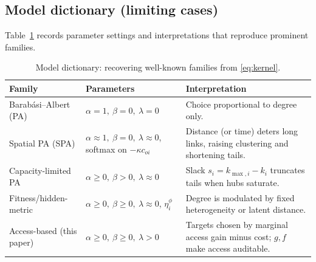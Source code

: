 \documentclass{article}[12pt]
\begin{document}

\subsection{Model dictionary (limiting cases)}
Table~\ref{tab:dictionary} records parameter settings and interpretations that reproduce prominent families.

\begin{table}[H]
\centering
\caption{Model dictionary: recovering well-known families from \eqref{eq:kernel}.}
\label{tab:dictionary}
\begin{tabular}{@{}llp{6.2cm}@{}}
\toprule
Family & Parameters & Interpretation \\
\midrule
Barab\'asi--Albert (PA) & $\alpha=1,\ \beta=0,\ \lambda=0$ & Choice proportional to degree only. \\
Spatial PA (SPA) & $\alpha\approx1,\ \beta=0,\ \lambda\approx 0$, softmax on $-\kappa c_{oi}$ & Distance (or time) deters long links, raising clustering and shortening tails. \\
Capacity-limited PA & $\alpha\ge 0,\ \beta>0,\ \lambda\approx 0$ & Slack $s_i=k_{\max,i}-k_i$ truncates tails when hubs saturate. \\
Fitness/hidden-metric & $\alpha\ge0,\ \beta\ge0,\ \lambda\approx 0$, $\eta_i^{\phi}$ & Degree is modulated by fixed heterogeneity or latent distance. \\
Access-based (this paper) & $\alpha\ge0,\ \beta\ge0,\ \lambda>0$ & Targets chosen by marginal access gain minus cost; $g,f$ make access auditable. \\
\bottomrule
\end{tabular}
\end{table}
\end{document}
